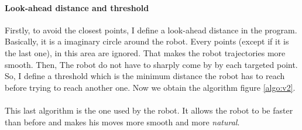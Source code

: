 \paragraph{Look-ahead distance and threshold}{
    Firstly, to avoid the closest points, I define a look-ahead distance in the
 program. Basically, it is a imaginary circle around the robot. Every points
 (except if it is the last one), in this area are ignored. That makes the
 robot trajectories more smooth. Then, The robot do not have to sharply come by
 by each targeted point. So, I define a threshold which is the minimum distance
 the robot has to reach before trying to reach another one. Now we obtain the
 algorithm figure \ref{algo:v2}.
}

\paragraph{}{
    This last algorithm is the one used by the robot. It allows the robot to
 be faster than before and makes his moves more smooth and more 
 \textit{natural}.
}

